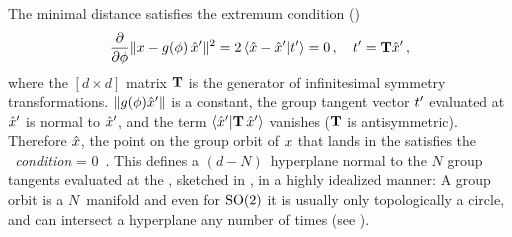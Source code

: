\documentclass[aip,cha,reprint,
secnumarabic,
nofootinbib, tightenlines,
nobibnotes, showkeys, showpacs,
groupedaddress
]{revtex4-1}
\begin{document}
The minimal distance satisfies
the extremum condition ()
\[
\frac{\partial}{\partial \gSpace} \Norm{\ssp - \LieEl(\gSpace)\,\slicep}^2
   =
2\, \braket{\sspRed - \slicep}{\sliceTan{}}
   = 0
        \,,\quad
\sliceTan{} = \Lg \slicep
\,,
\]
where the $[d\!\times\!d]$ matrix $\mathbf{T}$ is the generator of infinitesimal
symmetry transformations. $\|{g({\bf \phi}){\hat{x}'}}\|$ is a constant,
the group tangent vector $t'_{}$ evaluated at ${\hat{x}'}$
is normal to ${\hat{x}'}$, and the term
$\braket{\slicep}{\Lg \,\slicep}$ vanishes ($\mathbf{T}$ is antisymmetric).
Therefore  $\hat{x}$, the point on the group orbit of $x$ that lands
in the \slice satisfies the \emph{\slice\ condition}
\beq
\braket{\sspRed}{\sliceTan{}} = 0
    \,.
This defines a $(d\!-\!N)$\dmn\ hyperplane normal to
the $N$ group tangents evaluated at the \slicep, sketched in
, in a highly idealized manner: A group orbit is a
$N$\dmn\ manifold and even for $\textrm{SO}(2)$ it is usually only topologically
a circle, and can intersect a hyperplane any number of times  (see
).


\end{document}
